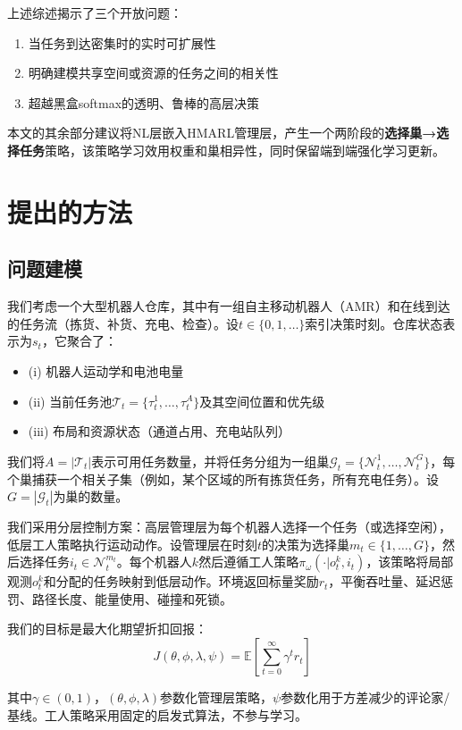 \documentclass[12pt,a4paper]{article}
\begin{document}
上述综述揭示了三个开放问题：
\begin{enumerate}
\item 当任务到达密集时的实时可扩展性
\item 明确建模共享空间或资源的任务之间的相关性
\item 超越黑盒softmax的透明、鲁棒的高层决策
\end{enumerate}

本文的其余部分建议将NL层嵌入HMARL管理层，产生一个两阶段的\textbf{选择巢→选择任务}策略，该策略学习效用权重和巢相异性，同时保留端到端强化学习更新。

\section{提出的方法}

\subsection{问题建模}

我们考虑一个大型机器人仓库，其中有一组自主移动机器人（AMR）和在线到达的任务流（拣货、补货、充电、检查）。设$t \in \{0,1,\dots\}$索引决策时刻。仓库状态表示为$s_t$，它聚合了：
\begin{itemize}
\item (i) 机器人运动学和电池电量
\item (ii) 当前任务池$\mathcal{T}_t = \{\tau^1_t, \dots, \tau^{A}_t\}$及其空间位置和优先级
\item (iii) 布局和资源状态（通道占用、充电站队列）
\end{itemize}

我们将$A = |\mathcal{T}_t|$表示可用任务数量，并将任务分组为一组巢$\mathcal{G}_t = \{\mathcal{N}^1_t, \dots, \mathcal{N}^{G}_t\}$，每个巢捕获一个相关子集（例如，某个区域的所有拣货任务，所有充电任务）。设$G = |\mathcal{G}_t|$为巢的数量。

我们采用分层控制方案：高层管理层为每个机器人选择一个任务（或选择空闲），低层工人策略执行运动动作。设管理层在时刻$t$的决策为选择巢$m_t \in \{1, \dots, G\}$，然后选择任务$i_t \in \mathcal{N}^{m_t}_t$。每个机器人$k$然后遵循工人策略$\pi_\omega(\cdot | o^k_t, i_t)$，该策略将局部观测$o^k_t$和分配的任务映射到低层动作。环境返回标量奖励$r_t$，平衡吞吐量、延迟惩罚、路径长度、能量使用、碰撞和死锁。

我们的目标是最大化期望折扣回报：
\[J(\theta, \phi, \lambda, \psi) = \mathbb{E}\left[\sum_{t=0}^{\infty} \gamma^t r_t\right]\]

其中$\gamma \in (0,1)$，$(\theta, \phi, \lambda)$参数化管理层策略，$\psi$参数化用于方差减少的评论家/基线。工人策略采用固定的启发式算法，不参与学习。
\end{document}
